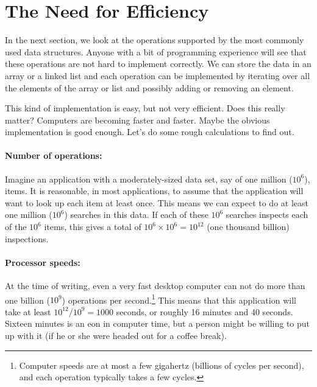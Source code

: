 \section{The Need for Efficiency}

In the next section, we look at the operations supported by the most
commonly used data structures.  Anyone with a bit of programming
experience will see that these operations are not hard to implement
correctly.  We can store the data in an array or a linked list and each
operation can be implemented by iterating over all the elements of the
array or list and possibly adding or removing an element.

This kind of implementation is easy, but not very efficient.  Does this
really matter?  Computers are becoming faster and faster. Maybe the
obvious implementation is good enough. Let's do some rough calculations
to find out.

\paragraph{Number of operations:}  Imagine an application with a
moderately-sized data set, say of one million ($10^6$), items.  It is
reasonable, in most applications, to assume that the application will
want to look up each item at least once.  This means we can expect to do
at least one million ($10^6$) searches in this data.  If each of these
$10^6$ searches inspects  each of the $10^6$ items, this gives a total
of $10^6\times 10^6=10^{12}$ (one thousand billion) inspections.

\paragraph{Processor speeds:} At the time of writing, even a very fast
desktop computer can not do more than one billion ($10^9$) operations per
second.\footnote{Computer speeds are at most a few gigahertz (billions
of cycles per second), and each operation typically takes a few cycles.}
This means that this application will take at least $10^{12}/10^9 = 1000$
seconds, or roughly 16 minutes and 40 seconds.  Sixteen minutes is an
eon in computer time, but a person might be willing to put up with it
(if he or she were headed out for a coffee break).


